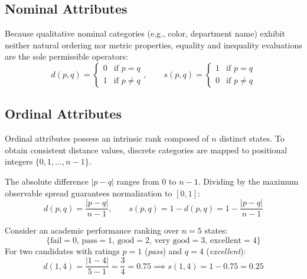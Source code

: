 \subsection{Nominal Attributes}
Because qualitative nominal categories (e.g., color, department name) exhibit neither natural ordering nor metric properties, equality and inequality evaluations are the sole permissible operators:
\begin{equation}
    d(p, q) = \begin{cases} 0 & \text{if } p = q \\ 1 & \text{if } p \neq q \end{cases}, \qquad
    s(p, q) = \begin{cases} 1 & \text{if } p = q \\ 0 & \text{if } p \neq q \end{cases}
\end{equation}

\subsection{Ordinal Attributes}
Ordinal attributes possess an intrinsic rank composed of $n$ distinct states. To obtain consistent distance values, discrete categories are mapped to positional integers $\{0, 1, \dots, n-1\}$.

The absolute difference $|p - q|$ ranges from $0$ to $n-1$. Dividing by the maximum observable spread guarantees normalization to $[0, 1]$:
\begin{equation}
    d(p, q) = \frac{|p - q|}{n - 1}, \qquad s(p, q) = 1 - d(p, q) = 1 - \frac{|p - q|}{n - 1}
\end{equation}

\begin{example}
Consider an academic performance ranking over $n = 5$ states:
\begin{equation}
    \{\text{fail} = 0,\, \text{pass} = 1,\, \text{good} = 2,\, \text{very good} = 3,\, \text{excellent} = 4\}
\end{equation}
For two candidates with ratings $p = 1$ (\textit{pass}) and $q = 4$ (\textit{excellent}):
\begin{equation}
    d(1, 4) = \frac{|1 - 4|}{5 - 1} = \frac{3}{4} = 0.75 \implies s(1, 4) = 1 - 0.75 = 0.25
\end{equation}
\end{example}

